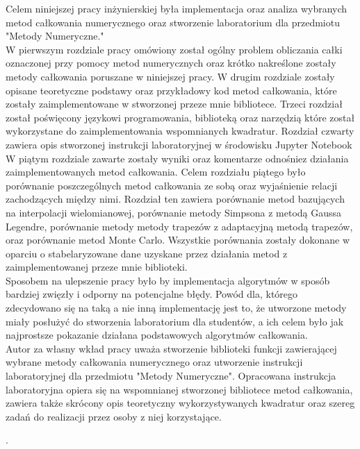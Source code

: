 \documentclass[12pt,twoside]{article}
\begin{document}
Celem niniejszej pracy inżynierskiej była implementacja oraz analiza wybranych metod całkowania numerycznego oraz stworzenie laboratorium dla przedmiotu "Metody Numeryczne."\\
	W pierwszym rozdziale pracy omówiony został ogólny problem obliczania całki oznaczonej przy pomocy metod numerycznych oraz krótko nakreślone zostały metody całkowania poruszane w niniejszej pracy. 
	W drugim rozdziale zostały opisane teoretyczne podstawy oraz przykładowy kod metod całkowania, które zostały zaimplementowane w stworzonej przeze mnie bibliotece. 
	Trzeci rozdział został poświęcony językowi programowania, biblioteką oraz narzędzią które został wykorzystane do zaimplementowania wspomnianych kwadratur.
	Rozdział czwarty zawiera opis stworzonej instrukcji laboratoryjnej w środowisku Jupyter Notebook
	W piątym rozdziale zawarte zostały wyniki oraz komentarze odnośniez działania zaimplementowanych metod całkowania.
	Celem rozdziału piątego było porównanie poszczególnych metod całkowania ze sobą  oraz wyjaśnienie relacji zachodzących między nimi. Rozdział ten zawiera porównanie metod bazujących na interpolacji wielomianowej, porównanie metody Simpsona z metodą Gaussa Legendre, porównanie metody metody trapezów z adaptacyjną metodą trapezów, oraz porównanie metod Monte Carlo. Wszystkie porównania zostały dokonane w oparciu o stabelaryzowane dane uzyskane przez działania metod z zaimplementowanej przeze mnie biblioteki.\\
	Sposobem na ulepszenie pracy było by implementacja algorytmów w sposób bardziej zwięzły i odporny na potencjalne błędy. Powód dla, którego zdecydowano się na taką a nie inną implementację jest to, że utworzone metody miały posłużyć do stworzenia laboratorium dla studentów, a ich celem było jak najprostsze pokazanie działana podstawowych algorytmów całkowania.\\
 Autor za własny wkład pracy uważa stworzenie biblioteki funkcji zawierającej wybrane metody całkowania numerycznego oraz utworzenie instrukcji laboratoryjnej dla przedmiotu "Metody Numeryczne". Opracowana instrukcja laboratoryjna opiera się na wspomnianej stworzonej bibliotece metod całkowania, zawiera także skrócony opis teoretyczny wykorzystywanych kwadratur oraz szereg zadań do realizacji przez osoby z niej korzystające.
 
.
\clearpage

\end{document}
